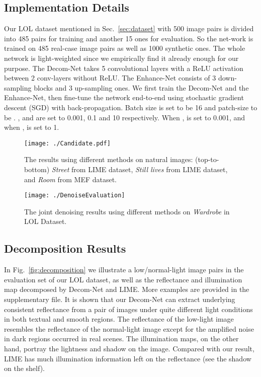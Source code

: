 \documentclass{bmvc2k}
\begin{document}
\subsection{Implementation Details}
Our LOL dataset mentioned in Sec.~\ref{sec:dataset} with 500 image pairs is divided into 485 pairs for training and another 15 ones for evaluation. So the net-work is trained on 485 real-case image pairs as well as 1000 synthetic ones. The whole network is light-weighted since we empirically find it already enough for our purpose. The Decom-Net takes 5 convolutional layers with a ReLU activation between 2 conv-layers without ReLU. The Enhance-Net consists of 3 down-sampling blocks and 3 up-sampling ones. We first train the Decom-Net and the Enhance-Net, then fine-tune the network end-to-end using stochastic gradient descent (SGD) with back-propagation.  Batch size is set to be 16 and patch-size to be . ,  and  are set to 0.001, 0.1 and 10 respectively. When ,  is set to 0.001, and when ,  is set to 1.
\begin{figure}[t]
	\centering
	\begin{minipage}[t]{\linewidth}
		\centering
		\texttt{[image: ./Candidate.pdf]}
		\end{minipage}
    \vspace{-0.6 cm}
	\caption{The results using different methods on natural images: (top-to-bottom) \emph{Street} from LIME dataset, \emph{Still lives} from LIME dataset, and \emph{Room} from MEF dataset.}
	\label{fig:compare}
\end{figure}

\begin{figure}[t]
	\centering
	\begin{minipage}[t]{\linewidth}
		\centering
		\texttt{[image: ./DenoiseEvaluation]}
		\end{minipage}
    \vspace{-0.6 cm}
	\caption{The joint denoising results using different methods on \emph{Wardrobe} in LOL Dataset.}
	\label{fig:denoise_evaluation}
\end{figure}

\subsection{Decomposition Results}
In Fig.~\ref{fig:decomposition} we illustrate a low/normal-light image pairs in the evaluation set of our LOL dataset, as well as the reflectance and illumination map decomposed by Decom-Net and LIME. More examples are provided in the supplementary file. It is shown that our Decom-Net can extract underlying consistent reflectance from a pair of images under quite different light conditions in both textual and smooth regions. The reflectance of the low-light image resembles the reflectance of the normal-light image except for the amplified noise in dark regions occurred in real scenes. The illumination maps, on the other hand, portray the lightness and shadow on the image. Compared with our result, LIME has much illumination information left on the reflectance (see the shadow on the shelf).
\end{document}
